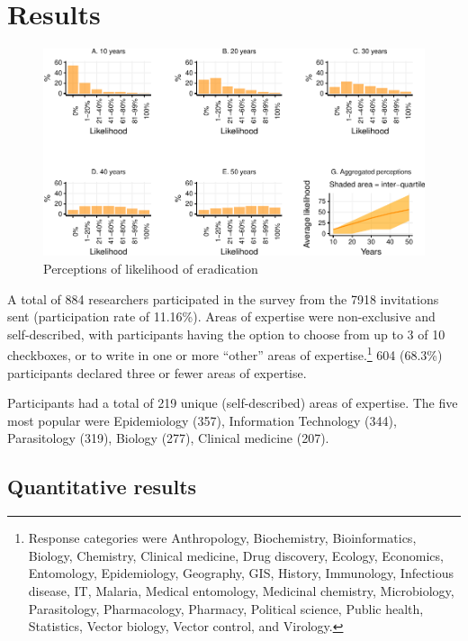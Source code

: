 \documentclass[]{article}
\let\rmarkdownfootnote\footnote%
\def\footnote{\protect\rmarkdownfootnote}
\begin{document}
\section{Results}\label{results}

\begin{figure}[h]

{\centering \includegraphics{paper_files/figure-latex/unnamed-chunk-5-1} 

}

\caption{Perceptions of likelihood of eradication}\label{fig:unnamed-chunk-5}
\end{figure}

A total of 884 researchers participated in the survey from the 7918
invitations sent (participation rate of 11.16\%). Areas of expertise
were non-exclusive and self-described, with participants having the
option to choose from up to 3 of 10 checkboxes, or to write in one or
more ``other'' areas of
expertise.\footnote{Response categories were Anthropology, Biochemistry, Bioinformatics, Biology, Chemistry, Clinical medicine, Drug discovery, Ecology, Economics, Entomology, Epidemiology, Geography, GIS, History, Immunology, Infectious disease, IT, Malaria, Medical entomology, Medicinal chemistry, Microbiology, Parasitology, Pharmacology, Pharmacy, Political science, Public health, Statistics, Vector biology, Vector control, and Virology.}
604 (68.3\%) participants declared three or fewer areas of expertise.

Participants had a total of 219 unique (self-described) areas of
expertise. The five most popular were Epidemiology (357), Information
Technology (344), Parasitology (319), Biology (277), Clinical medicine
(207).

\subsection*{Quantitative results}
\end{document}
